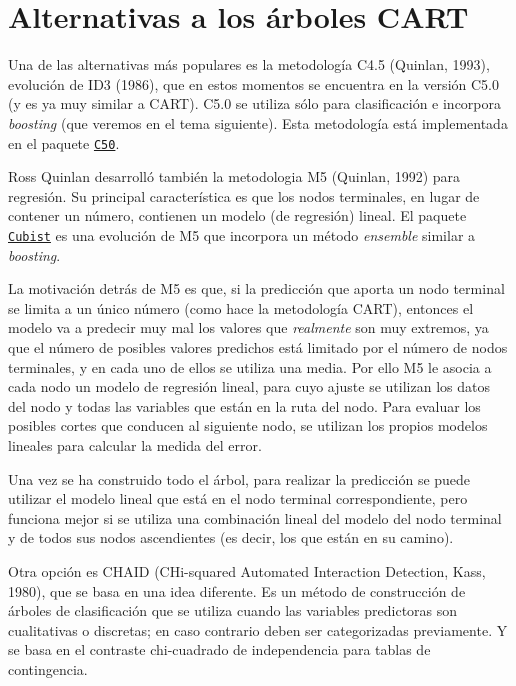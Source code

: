 \documentclass[]{book}
\theoremstyle{break}
\theoremstyle{definition}
\theoremstyle{definition}
\theoremstyle{definition}
\theoremstyle{remark}
\begin{document}
\section{Alternativas a los árboles
CART}\label{alternativas-a-los-uxe1rboles-cart}

Una de las alternativas más populares es la metodología C4.5 (Quinlan,
1993), evolución de ID3 (1986), que en estos momentos se encuentra en la
versión C5.0 (y es ya muy similar a CART). C5.0 se utiliza sólo para
clasificación e incorpora \emph{boosting} (que veremos en el tema
siguiente). Esta metodología está implementada en el paquete
\href{https://topepo.github.io/C5.0/index.html}{\texttt{C50}}.

Ross Quinlan desarrolló también la metodologia M5 (Quinlan, 1992) para
regresión. Su principal característica es que los nodos terminales, en
lugar de contener un número, contienen un modelo (de regresión) lineal.
El paquete \href{https://topepo.github.io/Cubist}{\texttt{Cubist}} es
una evolución de M5 que incorpora un método \emph{ensemble} similar a
\emph{boosting}.

La motivación detrás de M5 es que, si la predicción que aporta un nodo
terminal se limita a un único número (como hace la metodología CART),
entonces el modelo va a predecir muy mal los valores que
\emph{realmente} son muy extremos, ya que el número de posibles valores
predichos está limitado por el número de nodos terminales, y en cada uno
de ellos se utiliza una media. Por ello M5 le asocia a cada nodo un
modelo de regresión lineal, para cuyo ajuste se utilizan los datos del
nodo y todas las variables que están en la ruta del nodo. Para evaluar
los posibles cortes que conducen al siguiente nodo, se utilizan los
propios modelos lineales para calcular la medida del error.

Una vez se ha construido todo el árbol, para realizar la predicción se
puede utilizar el modelo lineal que está en el nodo terminal
correspondiente, pero funciona mejor si se utiliza una combinación
lineal del modelo del nodo terminal y de todos sus nodos ascendientes
(es decir, los que están en su camino).

Otra opción es CHAID (CHi-squared Automated Interaction Detection, Kass,
1980), que se basa en una idea diferente. Es un método de construcción
de árboles de clasificación que se utiliza cuando las variables
predictoras son cualitativas o discretas; en caso contrario deben ser
categorizadas previamente. Y se basa en el contraste chi-cuadrado de
independencia para tablas de contingencia.
\end{document}
